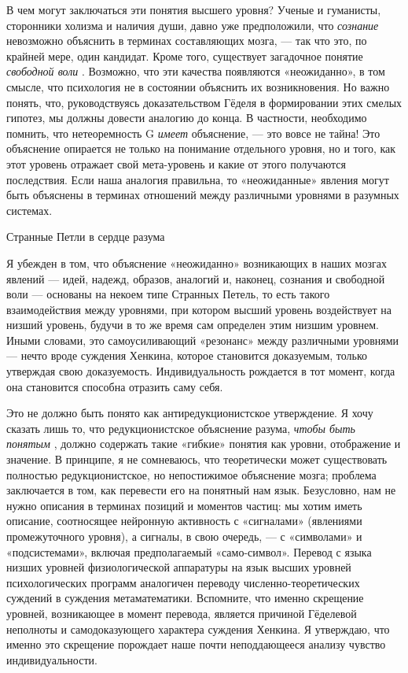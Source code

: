 \documentclass[../main.tex]{subfiles}
\begin{document}
В чем могут заключаться эти понятия высшего уровня? Ученые и гуманисты, сторонники холизма и наличия души, давно уже предположили, что \emph{сознание} невозможно объяснить в терминах составляющих мозга, --- так что это, по крайней мере, один кандидат. Кроме того, существует загадочное понятие \emph{свободной воли} . Возможно, что эти качества появляются «неожиданно», в том смысле, что психология не в состоянии объяснить их возникновения. Но важно понять, что, руководствуясь доказательством Гёделя в формировании этих смелых гипотез, мы должны довести аналогию до конца. В частности, необходимо помнить, что нетеоремность G \emph{имеет} объяснение, --- это вовсе не тайна! Это объяснение опирается не только на понимание отдельного уровня, но и того, как этот уровень отражает свой мета-уровень и какие от этого получаются последствия. Если наша аналогия правильна, то «неожиданные» явления могут быть объяснены в терминах отношений между различными уровнями в разумных системах.

Странные Петли в сердце разума

Я убежден в том, что объяснение «неожиданно» возникающих в наших мозгах явлений --- идей, надежд, образов, аналогий и, наконец, сознания и свободной воли --- основаны на некоем типе Странных Петель, то есть такого взаимодействия между уровнями, при котором высший уровень воздействует на низший уровень, будучи в то же время сам определен этим низшим уровнем. Иными словами, это самоусиливающий «резонанс» между различными уровнями --- нечто вроде суждения Хенкина, которое становится доказуемым, только утверждая свою доказуемость. Индивидуальность рождается в тот момент, когда она становится способна отразить саму себя.

Это не должно быть понято как антиредукционистское утверждение. Я хочу сказать лишь то, что редукционистское объяснение разума, \emph{чтобы быть понятым} , должно содержать такие «гибкие» понятия как уровни, отображение и значение. В принципе, я не сомневаюсь, что теоретически может существовать полностью редукционистское, но непостижимое объяснение мозга; проблема заключается в том, как перевести его на понятный нам язык. Безусловно, нам не нужно описания в терминах позиций и моментов частиц: мы хотим иметь описание, соотносящее нейронную активность с «сигналами» (явлениями промежуточного уровня), а сигналы, в свою очередь, --- с «символами» и «подсистемами», включая предполагаемый «само-символ». Перевод с языка низших уровней физиологической аппаратуры на язык высших уровней психологических программ аналогичен переводу численно-теоретических суждений в суждения метаматематики. Вспомните, что именно скрещение уровней, возникающее в момент перевода, является причиной Гёделевой неполноты и самодоказующего характера суждения Хенкина. Я утверждаю, что именно это скрещение порождает наше почти неподдающееся анализу чувство индивидуальности.
\end{document}
